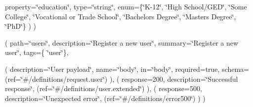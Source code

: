 property=\char`\"{}education\char`\"{}, type=\char`\"{}string\char`\"{}, enum=\{\char`\"{}\+K-\/12\char`\"{}, \char`\"{}\+High School/\+G\+E\+D\char`\"{}, \char`\"{}\+Some College\char`\"{}, \char`\"{}\+Vocational or Trade School\char`\"{}, \char`\"{}\+Bachelors Degree\char`\"{}, \char`\"{}\+Masters Degree\char`\"{}, \char`\"{}\+Ph\+D\char`\"{}\} ) )

( path=\char`\"{}users\char`\"{}, description=\char`\"{}\+Register a new user\char`\"{}, summary=\char`\"{}\+Register a new user\char`\"{}, tags=\{ \char`\"{}user\char`\"{}\},

( description=\char`\"{}\+User payload\char`\"{}, name=\char`\"{}body\char`\"{}, in=\char`\"{}body\char`\"{}, required=true, schema=(ref=\char`\"{}\#/definitions/request.\+user\char`\"{}) ), ( response=200, description=\char`\"{}\+Successful response\char`\"{}, (ref=\char`\"{}\#/definitions/user.\+extended\char`\"{}) ), ( response=500, description=\char`\"{}\+Unexpected error\char`\"{}, (ref=\char`\"{}\#/definitions/error500\char`\"{}) ) ) 
